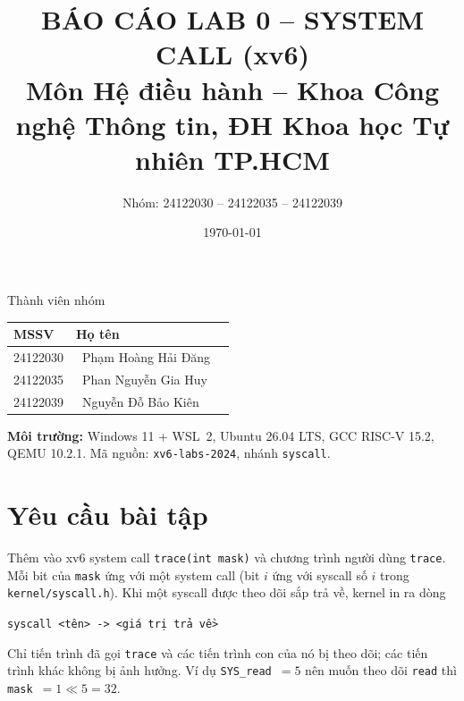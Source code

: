\documentclass[12pt,a4paper]{article}
\title{\textbf{BÁO CÁO LAB 0 -- SYSTEM CALL (xv6)}\\[4pt]
\large Môn Hệ điều hành -- Khoa Công nghệ Thông tin, ĐH Khoa học Tự nhiên TP.HCM}
\author{Nhóm: 24122030 -- 24122035 -- 24122039}
\date{\today}
\newcommand{\code}[1]{\texttt{#1}}
\begin{document}
\maketitle

Thành viên nhóm
\begin{center}
\begin{tabular}{llp{0cm}}
\toprule
\textbf{MSSV} & \textbf{Họ tên} \\
\midrule
24122030 & \ Phạm Hoàng Hải Đăng \\
24122035 & \ Phan Nguyễn Gia Huy \\
24122039 & \ Nguyễn Đỗ Bảo Kiên \\
\bottomrule
\end{tabular}
\end{center}
\textbf{Môi trường:} Windows 11 + WSL~2, Ubuntu 26.04 LTS, GCC RISC-V 15.2, QEMU 10.2.1. Mã nguồn: \code{xv6-labs-2024}, nhánh \code{syscall}.

\section{Yêu cầu bài tập}
Thêm vào xv6 system call \code{trace(int mask)} và chương trình người dùng \code{trace}. Mỗi bit của \code{mask} ứng với một system call (bit $i$ ứng với syscall số $i$ trong \code{kernel/syscall.h}). Khi một syscall được theo dõi sắp trả về, kernel in ra dòng
\begin{center}\code{syscall <tên> -> <giá trị trả về>}\end{center}
Chỉ tiến trình đã gọi \code{trace} và các tiến trình con của nó bị theo dõi; các tiến trình khác không bị ảnh hưởng. Ví dụ \code{SYS\_read}~$=5$ nên muốn theo dõi \code{read} thì \code{mask}~$=1\ll5=32$.

\end{document}
